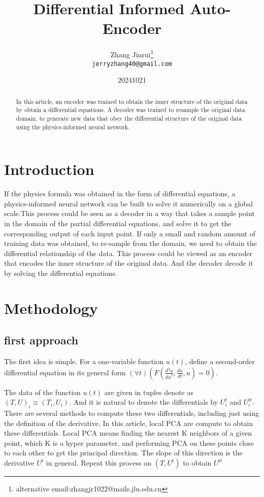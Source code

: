 \documentclass{article}
\title{Differential Informed Auto-Encoder}
\author{Zhang Jinrui\thanks{alternative email:zhangjr1022@mails.jlu.edu.cn} \\ \texttt{jerryzhang40@gmail.com}}
\date{20241021}  %
\begin{document}
\maketitle

\begin{abstract}
    In this article, an encoder was trained to obtain the inner
    structure of the original data by obtain a differential equations.
    A decoder was trained to resample the original data domain, to generate new data that obey the differential structure of the original data using the physics-informed neural network\cite[PINN]{raissi2017physics}.
\end{abstract}

\section{Introduction}
If the physics formula was obtained in the form of differential equations,
a physics-informed neural network can be built to solve it numerically
on a global scale\cite[PINN]{raissi2017physics}.This process could be seen
as a decoder in a way that takes a sample point in the domain of
the partial differential equations, and solve it to get the corresponding
output of each input point. If only a small and random amount of
training data was obtained, to re-sample from the domain, we need
to obtain the differential relationship of the data. This process
could be viewed as an encoder that encodes the inner structure of
the original data. And the decoder decode it by solving the
differential equations.

\section{Methodology}
\subsection{first approach}
The first idea is simple. For a one-variable function $u(t)$,
define a second-order differential equation
in its general form $(\forall t)(F(\frac{d^2u}{{du}^2},\frac{du}{dt},u)=0)$.

The data of the function $u(t)$ are given in tuples denote as
$(T,U)_i\equiv(T_i,U_i)$. And it is natural to denote the differentials
by $U^{t}_{i}$ and $U^{tt}_{i}$. There are several methods to compute
these two differentials, including just using the definition of
the derivative. In this article, local PCA are compute to obtain
these differentials. Local PCA means finding the nearest K neighbors
of a given point, which K is a hyper parameter, and performing PCA
on these points close to each other to get the principal direction.
The slope of this direction is the derivative $U^{t}$ in general.
Repeat this process on $(T,U^{t})$ to obtain $U^{tt}$
\end{document}
